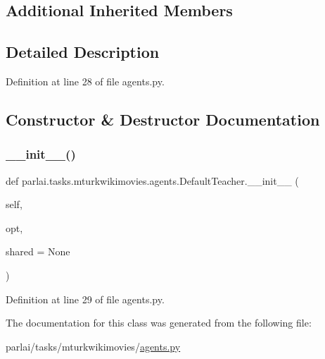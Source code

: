 \subsection*{Additional Inherited Members}


\subsection{Detailed Description}


Definition at line 28 of file agents.\+py.



\subsection{Constructor \& Destructor Documentation}
\mbox{\label{classparlai_1_1tasks_1_1mturkwikimovies_1_1agents_1_1DefaultTeacher_ae77ddc3240f18cf49cc2c2a5c4dcfb49}} 
\subsubsection{\texorpdfstring{\+\_\+\+\_\+init\+\_\+\+\_\+()}{\_\_init\_\_()}}
{\footnotesize\ttfamily def parlai.\+tasks.\+mturkwikimovies.\+agents.\+Default\+Teacher.\+\_\+\+\_\+init\+\_\+\+\_\+ (\begin{DoxyParamCaption}\item[{}]{self,  }\item[{}]{opt,  }\item[{}]{shared = {\ttfamily None} }\end{DoxyParamCaption})}



Definition at line 29 of file agents.\+py.



The documentation for this class was generated from the following file\+:\begin{DoxyCompactItemize}
\item 
parlai/tasks/mturkwikimovies/\hyperlink{parlai_2tasks_2mturkwikimovies_2agents_8py}{agents.\+py}\end{DoxyCompactItemize}
